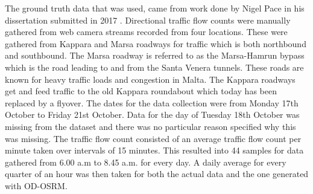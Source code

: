 \documentclass[12pt, a4paper]{report}
\theoremstyle{definition}
\theoremstyle{definition}%
\theoremstyle{definition}%
\theoremstyle{definition}%
\theoremstyle{definition}%
\theoremstyle{definition}%
\begin{document}

The ground truth data that was used, came from work done by Nigel Pace in his dissertation submitted in 2017 \cite{Pace2017}. Directional traffic flow counts were manually gathered from web camera streams recorded from four locations. These were gathered from Kappara and Marsa roadways for traffic which is both northbound and southbound. The Marsa roadway is referred to as the Marsa-Hamrun bypass which is the road leading to and from the Santa Venera tunnels. These roads are known for heavy traffic loads and congestion in Malta. The Kappara roadways get and feed traffic to the old Kappara roundabout which today has been replaced by a flyover. The dates for the data collection were from Monday 17th October to Friday 21st October. Data for the day of Tuesday 18th October was missing from the dataset and there was no particular reason specified why this was missing. The traffic flow count consisted of an average traffic flow count per minute taken over intervals of 15 minutes. This resulted into 44 samples for data gathered from 6.00 a.m to 8.45 a.m. for every day. A daily average for every quarter of an hour was then taken for both the actual data and the one generated with OD-OSRM.   


\end{document}
